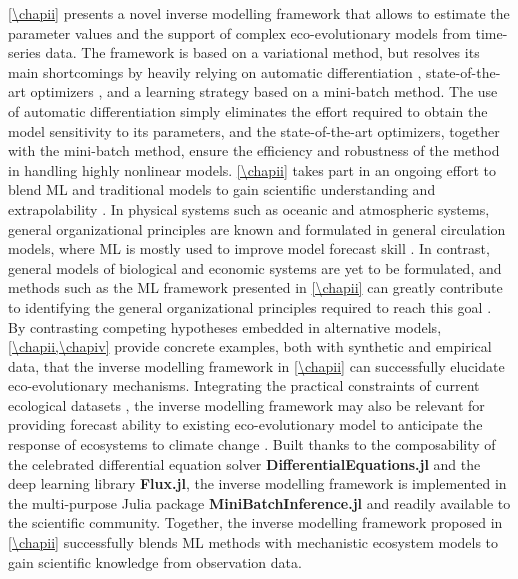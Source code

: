 %
\cref{\chapii} presents a novel inverse modelling framework that allows to estimate the parameter values and the support of complex eco-evolutionary models from time-series data.
% 
The framework is based on a variational method, but resolves its main shortcomings by heavily relying on automatic differentiation \citep{Rackauckas2020a}, state-of-the-art optimizers \citep{Kingma2014}, and a learning strategy based on a mini-batch method. 
% 
The use of automatic differentiation simply eliminates the effort required to obtain the model sensitivity to its parameters, and the state-of-the-art optimizers, together with the mini-batch method, ensure the efficiency and robustness of the method in handling highly nonlinear models.
% 
\cref{\chapii} takes part in an ongoing effort to blend ML and traditional models to gain scientific understanding and extrapolability \citep{Karpatne2017,Rackauckas2020a,Schneider2017,Rolnick2023,Kashinath2021,Yazdani2020,Raissi2019}. 
% 
In physical systems such as oceanic and atmospheric systems, general organizational principles are known and formulated in general circulation models, where ML is mostly used to improve model forecast skill \citep{Schneider2017}. In contrast, general models of biological and economic systems are yet to be formulated, and methods such as the ML framework presented in \cref{\chapii} can greatly contribute to identifying the general organizational principles required to reach this goal \citep{Karpatne2017}. 
% 
By contrasting competing hypotheses embedded in alternative models, \cref{\chapii,\chapiv} provide concrete examples, both with synthetic and empirical data, that the inverse modelling framework in \cref{\chapii} can successfully elucidate eco-evolutionary mechanisms.
Integrating the practical constraints of current ecological datasets \citep{Dornelas2018}, the inverse modelling framework may also be relevant for providing forecast ability to existing eco-evolutionary model \citep{Norberg2012} to anticipate the response of ecosystems to climate change \citep{Urban2016}.
% 
Built thanks to the composability of the celebrated differential equation solver \textbf{DifferentialEquations.jl} and the deep learning library \textbf{Flux.jl}, the inverse modelling framework is implemented in the multi-purpose Julia package \textbf{MiniBatchInference.jl} \citep{MiniBatchInference} and readily available to the scientific community. %
% 
Together, the inverse modelling framework proposed in \cref{\chapii} successfully blends ML methods with mechanistic ecosystem models to gain scientific knowledge from observation data. %


